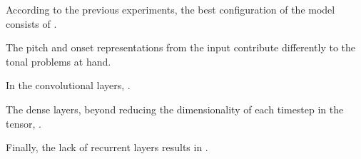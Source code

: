 

According to the previous experiments, the best
configuration of the model consists of .

The pitch and onset representations from the input
contribute differently to the tonal problems at hand.

In the convolutional layers, .

The dense layers, beyond reducing the dimensionality of each
timestep in the tensor, .

Finally, the lack of recurrent layers results in
.
